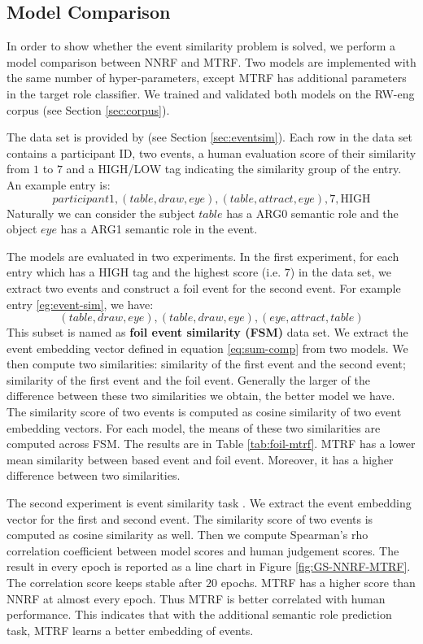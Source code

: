 \documentclass[a4paper]{article}
\begin{document}
\subsection{Model Comparison} \label{sec:comp_mtrf}
In order to show whether the event similarity problem is solved, we perform a model comparison between NNRF and MTRF. Two models are implemented with the same number of hyper-parameters, except MTRF has additional parameters in the target role classifier. We trained and validated both models on the RW-eng corpus (see Section \ref{sec:corpus}). 

The data set is provided by \citet{grefenstette2015concrete} (see Section \ref{sec:eventsim}). Each row in the data set contains a participant ID, two events, a human evaluation score of their similarity from $1$ to $7$ and a HIGH/LOW tag indicating the similarity group of the entry. An example entry is:
\begin{equation} \label{eg:event-sim}
    participant1, (table, draw, eye), (table, attract, eye), 7, \text{HIGH}
\end{equation}
Naturally we can consider the subject $table$ has a ARG0 semantic role and the object $eye$ has a ARG1 semantic role in the event.

The models are evaluated in two experiments. In the first experiment, for each entry which has a HIGH tag and the highest score (i.e. $7$) in the data set, we extract two events and construct a foil event for the second event. For example entry \eqref{eg:event-sim}, we have:
\begin{equation}
    (table, draw, eye), (table, draw, eye), (eye, attract, table)
\end{equation}
This subset is named as \textbf{foil event similarity (FSM)} data set. We extract the event embedding vector defined in equation  \eqref{eq:sum-comp} from two models. We then compute two similarities: similarity of the first event and the second event; similarity of the first event and the foil event. Generally the larger of the difference between these two similarities we obtain, the better model we have. The similarity score of two events is computed as cosine similarity of two event embedding vectors. For each model, the means of these two similarities are computed across FSM. The results are in Table \ref{tab:foil-mtrf}. MTRF has a lower mean similarity between based event and foil event. Moreover, it has a higher difference between two similarities.

The second experiment is event similarity task \citep{grefenstette2015concrete}. We extract the event embedding vector for the first and second event. The similarity score of two events is computed as cosine similarity as well. Then we compute Spearman's rho correlation coefficient between model scores and human judgement scores. The result in every epoch is reported as a line chart in Figure \ref{fig:GS-NNRF-MTRF}. The correlation score keeps stable after $20$ epochs. MTRF has a higher score than NNRF at almost every epoch. Thus MTRF is better correlated with human performance. This indicates that with the additional semantic role prediction task, MTRF learns a better embedding of events. 
\end{document}
